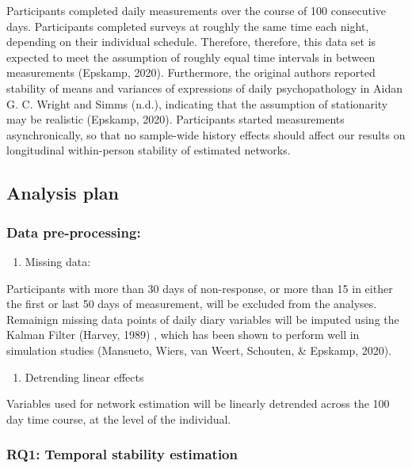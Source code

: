 \documentclass[
  english,
  man]{apa6}
\providecommand{\tightlist}{%
  \setlength{\itemsep}{0pt}\setlength{\parskip}{0pt}}
\begin{document}
Participants completed daily measurements over the course of 100 consecutive days. Participants completed surveys at roughly the same time each night, depending on their individual schedule. Therefore, therefore, this data set is expected to meet the assumption of roughly equal time intervals in between measurements (Epskamp, 2020). Furthermore, the original authors reported stability of means and variances of expressions of daily psychopathology in Aidan G. C. Wright and Simms (n.d.), indicating that the assumption of stationarity may be realistic (Epskamp, 2020). Participants started measurements asynchronically, so that no sample-wide history effects should affect our results on longitudinal within-person stability of estimated networks.

\hypertarget{analysis-plan}{%
\subsection{Analysis plan}\label{analysis-plan}}

\hypertarget{data-pre-processing}{%
\subsubsection{Data pre-processing:}\label{data-pre-processing}}

\begin{enumerate}
\def\labelenumi{\arabic{enumi})}
\tightlist
\item
  Missing data:
\end{enumerate}

Participants with more than 30 days of non-response, or more than 15 in either the first or last 50 days of measurement, will be excluded from the analyses. Remainign missing data points of daily diary variables will be imputed using the Kalman Filter (Harvey, 1989) , which has been shown to perform well in simulation studies (Mansueto, Wiers, van Weert, Schouten, \& Epskamp, 2020).

\begin{enumerate}
\def\labelenumi{\arabic{enumi})}
\setcounter{enumi}{1}
\tightlist
\item
  Detrending linear effects
\end{enumerate}

Variables used for network estimation will be linearly detrended across the 100 day time course, at the level of the individual.

\hypertarget{rq1-temporal-stability-estimation}{%
\subsubsection{RQ1: Temporal stability estimation}\label{rq1-temporal-stability-estimation}}
\end{document}
